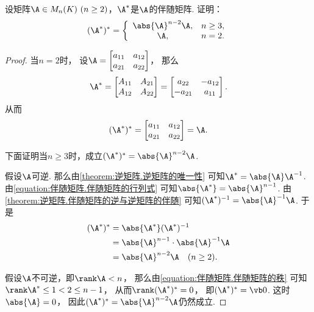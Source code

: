 \begin{example}
设矩阵\(\A \in M_n(K)\ (n\geq2)\)，\(\A^*\)是\(\A\)的伴随矩阵.
证明：\begin{equation}\label{equation:伴随矩阵.伴随矩阵的伴随}
	(\A^*)^* = \left\{ \begin{array}{cl}
		\abs{\A}^{n-2} \A, & n\geq3, \\
		\A, & n=2.
	\end{array} \right.
\end{equation}
\begin{proof}
当\(n=2\)时，
设\(\A = \begin{bmatrix}
	a_{11} & a_{12} \\
	a_{21} & a_{22}
\end{bmatrix}\)，
那么\[
	\A^* = \begin{bmatrix}
		A_{11} & A_{21} \\
		A_{12} & A_{22}
	\end{bmatrix}
	= \begin{bmatrix}
		a_{22} & - a_{12} \\
		- a_{21} & a_{11}
	\end{bmatrix}.
\]
从而\[
	(\A^*)^* = \begin{bmatrix}
		a_{11} & a_{12} \\
		a_{21} & a_{22}
	\end{bmatrix}
	= \A.
\]

下面证明当\(n\geq3\)时，成立\((\A^*)^* = \abs{\A}^{n-2} \A\).

假设\(\A\)可逆.
那么由\cref{theorem:逆矩阵.逆矩阵的唯一性}
可知\(\A^* = \abs{\A} \A^{-1}\).
由\cref{equation:伴随矩阵.伴随矩阵的行列式}
可知\(\abs{\A^*} = \abs{\A}^{n-1}\).
由\cref{theorem:逆矩阵.伴随矩阵的逆与逆矩阵的伴随}
可知\((\A^*)^{-1} = \abs{\A}^{-1} \A\).
于是\begin{align*}
	(\A^*)^*
	&= \abs{\A^*} (\A^*)^{-1} \\
	&= \abs{\A}^{n-1} \cdot \abs{\A}^{-1} \A \\
	&= \abs{\A}^{n-2} \A
	\quad(n\geq2).
\end{align*}

假设\(\A\)不可逆，即\(\rank\A<n\)，
那么由\cref{equation:伴随矩阵.伴随矩阵的秩}
可知\(\rank\A^* \leq 1 < 2 \leq n-1\)，
从而\(\rank(\A^*)^* = 0\)，
即\((\A^*)^* = \vb0\).
这时\(\abs{\A}=0\)，
因此\((\A^*)^* = \abs{\A}^{n-2} \A\)仍然成立.
\end{proof}
\end{example}

